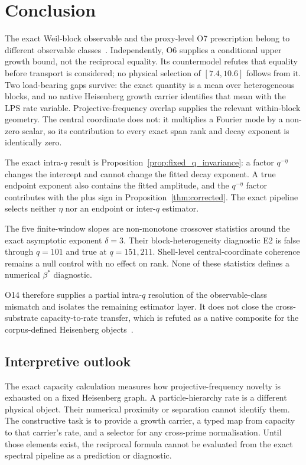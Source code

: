 \documentclass[11pt]{article}
\begin{document}
  \section{Conclusion}
  \label{sec:conclusion}

  The exact Weil-block observable and the proxy-level O7 prescription belong to different
  observable classes~\cite{Beau2026a11,Beau2026a16,Beau2026a17}.
  Independently, O6 supplies a conditional upper growth bound, not the reciprocal equality.
  Its countermodel refutes that equality before transport is considered; no physical selection of
  $[7.4,10.6]$ follows from it.
  Two load-bearing gaps survive: the exact quantity is a mean over heterogeneous blocks, and no
  native Heisenberg growth carrier identifies that mean with the LPS rate variable.
  Projective-frequency overlap supplies the relevant within-block geometry.
  The central coordinate does not: it multiplies a Fourier mode by a non-zero scalar, so its
  contribution to every exact span rank and decay exponent is identically zero.

  The exact intra-$q$ result is Proposition~\ref{prop:fixed_q_invariance}: a factor
  $q^{-\eta}$ changes the intercept and cannot change the fitted decay exponent.
  A true endpoint exponent also contains the fitted amplitude, and the $q^{-\eta}$ factor contributes
  with the plus sign in Proposition~\ref{thm:corrected}.
  The exact pipeline selects neither $\eta$ nor an endpoint or inter-$q$ estimator.

  The five finite-window slopes are non-monotone crossover statistics around the exact asymptotic
  exponent $\delta=3$.
  Their block-heterogeneity diagnostic E2 is false through $q=101$ and true at $q=151,211$.
  Shell-level central-coordinate coherence remains a null control with no effect on rank.
  None of these statistics defines a numerical $\beta^{*}$ diagnostic.

  O14 therefore supplies a partial intra-$q$ resolution of the observable-class mismatch and
  isolates the remaining estimator layer.
  It does not close the cross-substrate capacity-to-rate transfer, which is refuted as a native
  composite for the corpus-defined Heisenberg objects~\cite{Beau2026sgn}.

  \subsection*{Interpretive outlook}
  The exact capacity calculation measures how projective-frequency novelty is exhausted on a fixed
  Heisenberg graph.
  A particle-hierarchy rate is a different physical object.
  Their numerical proximity or separation cannot identify them.
  The constructive task is to provide a growth carrier, a typed map from capacity to that carrier's
  rate, and a selector for any cross-prime normalisation.
  Until those elements exist, the reciprocal formula cannot be evaluated from the exact spectral
  pipeline as a prediction or diagnostic.

  
      
\end{document}
